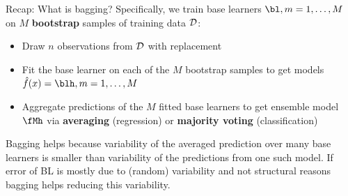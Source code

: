 \documentclass[11pt,compress,t,notes=noshow, xcolor=table]{beamer}
\begin{document}
\begin{vbframe}{Recap: What is bagging?}
\framebreak 
Specifically, we train base learners $\bl, m = 1, \dots, M$ on $M$ \textbf{bootstrap} samples of training data $\mathcal{D}$:
\begin{itemize}  \setlength{\itemsep}{1.0em}
  \item Draw $n$ observations from $\mathcal{D}$ with replacement
  \item Fit the base learner on each of the $M$ bootstrap samples to get models $\fh(x) = \blh, m = 1, \dots, M$
\item Aggregate predictions of the $M$ fitted base learners to get ensemble model $\fMh$ via \textbf{averaging} (regression) or \textbf{majority voting} (classification)
\end{itemize}
\vspace{0.1cm}
{\small Bagging helps because variability of the averaged prediction over many base learners is smaller than variability of the predictions from one such model. If error of BL is mostly due to (random) variability and not structural reasons bagging helps reducing this variability.}




\end{vbframe}
\end{document}
